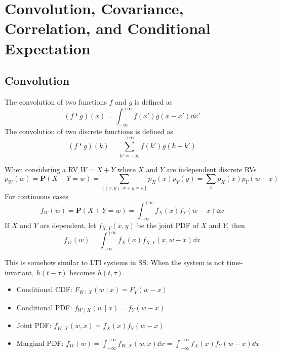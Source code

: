 \chapter{Convolution, Covariance, Correlation, and Conditional Expectation}

\section{Convolution}
\begin{definition}[Convolution]
    The convolution of two functions $f$ and $g$ is defined as
    \begin{equation}
        (f * g)(x) = \int_{-\infty}^{+\infty} f(x') g(x - x') \dd{x'}
    \end{equation}
    The convolution of two discrete functions is defined as
    \begin{equation}
        (f * g)(k) = \sum_{k' = -\infty}^{+\infty} f(k') g(k - k')
    \end{equation}
\end{definition}
When considering a RV $W = X + Y$ where $X$ and $Y$ are independent discrete RVs
\begin{equation}
    p_{W}(w) = \mathbf{P}(X + Y = w) = \sum_{\{(x, y): x + y = w\}} p_{X}(x) p_{Y}(y) = \sum_{x} p_{X}(x) p_{Y}(w - x)
\end{equation}
For continuous cases
\begin{equation}
    f_{W}(w) = \mathbf{P}(X + Y = w) = \int_{-\infty}^{+\infty} f_{X}(x) f_{Y}(w - x) \dd{x}
\end{equation}
If $X$ and $Y$ are dependent, let $f_{X, Y}(x, y)$ be the joint PDF of $X$ and $Y$, then
\begin{equation}
    f_{W}(w) = \int_{-\infty}^{+\infty} f_{X}(x) f_{X, Y}(x, w - x) \dd{x}
\end{equation}
\begin{remark}
    This is somehow similar to LTI systems in SS. When the system is not time-invariant, $h(t - \tau)$ becomes $h(t, \tau)$.
\end{remark}
\begin{remark}
    \begin{itemize}
    \item Conditional CDF: $F_{W \mid X}(w \mid x) = F_{Y}(w - x)$
    \item Conditional PDF: $f_{W \mid X}(w \mid x) = f_{Y}(w - x)$
    \item Joint PDF: $f_{W, X}(w, x) = f_{X}(x) f_{Y}(w - x)$
    \item Marginal PDF: $f_{W}(w) = \int_{-\infty}^{+\infty} f_{W, X}(w, x) \dd{x} = \int_{-\infty}^{+\infty} f_{X}(x) f_{Y}(w - x) \dd{x}$
    \end{itemize}
\end{remark}
